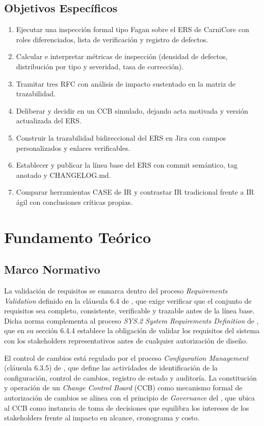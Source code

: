 \documentclass[11pt,a4paper]{article}
\begin{document}
\subsection{Objetivos Específicos}
\begin{enumerate}[nosep]
\item Ejecutar una inspección formal tipo Fagan sobre el ERS de CarniCore con roles diferenciados, lista de verificación y registro de defectos.
\item Calcular e interpretar métricas de inspección (densidad de defectos, distribución por tipo y severidad, tasa de corrección).
\item Tramitar tres RFC con análisis de impacto sustentado en la matriz de trazabilidad.
\item Deliberar y decidir en un CCB simulado, dejando acta motivada y versión actualizada del ERS.
\item Construir la trazabilidad bidireccional del ERS en Jira con campos personalizados y enlaces verificables.
\item Establecer y publicar la línea base del ERS con commit semántico, tag anotado y CHANGELOG.md.
\item Comparar herramientas CASE de IR y contrastar IR tradicional frente a IR ágil con conclusiones críticas propias.
\end{enumerate}

\section{Fundamento Teórico}
\subsection{Marco Normativo}
La validación de requisitos se enmarca dentro del proceso \textit{Requirements Validation}
definido en la cláusula 6.4 de \cite{iso29148}, que exige verificar que el conjunto de requisitos sea completo, consistente, verificable y trazable antes de la línea base. Dicha norma complementa
al proceso \textit{SYS.2 System Requirements Definition} de \cite{iso15288}, que en su sección 6.4.4 establece la obligación de validar los requisitos del sistema con los stakeholders representativos
antes de cualquier autorización de diseño.

El control de cambios está regulado por el proceso \textit{Configuration Management} (cláusula 6.3.5) de \cite{iso12207}, que define las actividades de identificación de la configuración, control
de cambios, registro de estado y auditoría. La constitución y operación de un \textit{Change
Control Board} (CCB) como mecanismo formal de autorización de cambios se alinea con
el principio de \textit{Governance} del \cite{pmbok7}, que ubica al CCB como instancia de toma de decisiones
que equilibra los intereses de los stakeholders frente al impacto en alcance, cronograma y costo.
\end{document}
